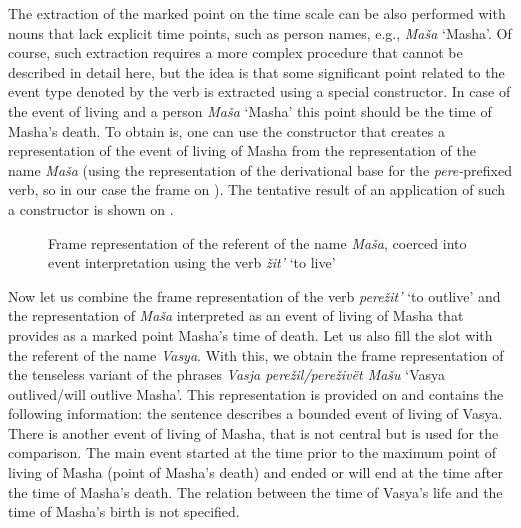 The extraction of the marked point on the time scale can be also performed with nouns that lack explicit time points, such as person names, e.g., \textit{Ma\v{s}a} `Masha'. Of course, such extraction requires a more complex procedure that cannot be described in detail here, but the idea is that some significant point related to the event type denoted by the verb is extracted using a special constructor. In case of the event of living and a person \textit{Ma\v{s}a} `Masha' this point should be the time of Masha's death. To obtain is, one can use the constructor that creates a representation of the event of living of Masha from the representation of the name \textit{Ma\v{s}a} (using the representation of the derivational base for the \textit{pere-}prefixed verb, so in our case the frame on ). The tentative result of an application of such a constructor is shown on .

\begin{figure}
\centering
{}
\caption{Frame representation of the referent of the name \textit{Ma\v{s}a}, coerced into event interpretation using the verb \textit{\v{z}it'} `to live' \label{frame:Masha:live}}
\end{figure}

Now let us combine the frame representation of the verb \textit{pere\v{z}it'} `to outlive' and the representation of \textit{Ma\v{s}a} interpreted as an event of living of Masha that provides as a marked point Masha's time of death. Let us also fill the \ACTOR slot with the referent of the name \textit{Vasya}. With this, we obtain the frame representation of the tenseless variant of the phrases \textit{Vasja pere\v{z}il/pere\v{z}iv\"{e}t Ma\v{s}u} `Vasya outlived/will outlive Masha'. This representation is provided on  and contains the following information: the sentence describes a bounded event  of living of Vasya. There is another event  of living of Masha, that is not central but is used for the comparison. The main event  started at the time prior to the maximum point of living of Masha (point of Masha's death) and ended or will end at the time after the time of Masha's death. The relation between the time of Vasya's life and the time of Masha's birth is not specified.

